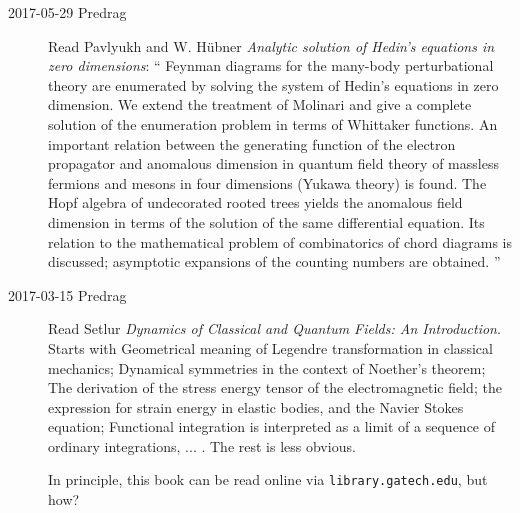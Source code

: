 \begin{description}
\item[2017-05-29 Predrag] Read
Pavlyukh and W. H{\"u}bner
{\em Analytic solution of {Hedin's} equations in zero dimensions}: ``
Feynman diagrams for the many-body perturbational theory are enumerated
by solving the system of Hedin’s equations in zero dimension. We extend
the treatment of Molinari and give a
complete solution of the enumeration problem in terms of Whittaker
functions. An important relation between the generating function of the
electron propagator and anomalous dimension in quantum field theory of
massless fermions and mesons in four dimensions (Yukawa theory) is found.
The Hopf algebra of undecorated rooted trees yields the anomalous field
dimension in terms of the solution of the same differential equation. Its
relation to the mathematical problem of combinatorics of chord diagrams
is discussed; asymptotic expansions of the counting numbers are obtained.
''


\item[2017-03-15 Predrag] Read
Setlur
{\em Dynamics of Classical and Quantum Fields: An Introduction}.
Starts with
Geometrical meaning of Legendre transformation in classical mechanics;
Dynamical symmetries in the context of Noether’s theorem;
The derivation of the stress energy tensor of the electromagnetic field;
the expression for strain energy in elastic bodies, and the Navier Stokes
equation;
Functional integration is interpreted as a limit of a sequence of
ordinary integrations, ... .
The rest is less obvious.

In principle, this book can be read online via
\texttt{library.gatech.edu}, but how?


\end{description}


\printbibliography[heading=subbibintoc,title={References}]
